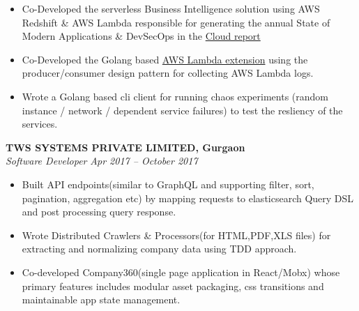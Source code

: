 \documentclass[margin,line]{resume}
\begin{document}
\begin{resume}
\begin{itemize}
            \item Co-Developed the serverless Business Intelligence solution  using AWS Redshift \& AWS Lambda responsible for generating the annual State of Modern Applications \& DevSecOps in the \href{https://www.sumologic.com/brief/state-modern-apps-report/}{Cloud report}
            \item Co-Developed the Golang based \href{https://github.com/SumoLogic/sumologic-lambda-extensions}{AWS Lambda extension} using the producer/consumer design pattern for collecting AWS Lambda logs.
            \item Wrote a Golang based cli client for running chaos experiments (random instance / network / dependent service failures) to test the resliency of the services.
            
            
        \end{itemize}
    \newpage
    \textbf{TWS SYSTEMS PRIVATE LIMITED, Gurgaon}\\
           \textsl{Software Developer} \hfill \textsl{Apr 2017 -- October 2017} \vspace{1mm}%
    \begin{itemize}

            \item Built API endpoints(similar to GraphQL and supporting filter, sort, pagination, aggregation etc) by mapping requests to elasticsearch Query DSL and post processing query response.
            \item Wrote Distributed Crawlers \& Processors(for HTML,PDF,XLS files) for extracting and normalizing company data using TDD approach.
           \item Co-developed Company360(single page application in React/Mobx) whose primary features includes modular asset packaging, css transitions and maintainable app state management.
        \end{itemize}


\end{resume}
\end{document}
